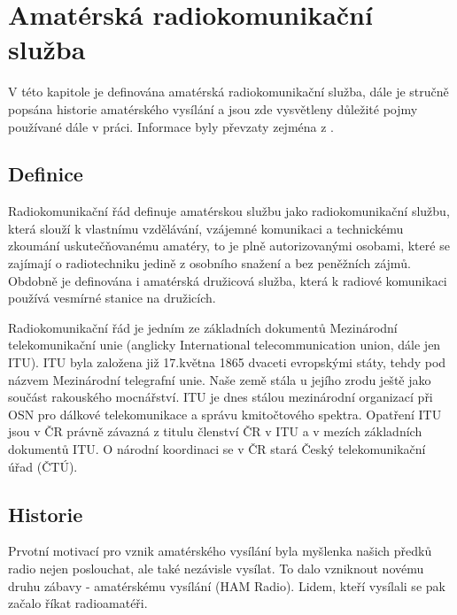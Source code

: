 \chapter{Amatérská radiokomunikační služba}
\label{radioamateri}

V této kapitole je definována amatérská radiokomunikační služba, dále je stručně popsána historie amatérského vysílání a jsou zde vysvětleny důležité pojmy používané dále v práci. Informace byly převzaty zejména z \cite{crk_hist}.

\section{Definice}
\label{radioamateri_def}

Radiokomunikační řád definuje amatérskou službu jako
radiokomunikační službu, která slouží k vlastnímu vzdělávání, vzájemné
komunikaci a technickému zkoumání uskutečňovanému amatéry, to je plně
autorizovanými osobami, které se zajímají o radiotechniku jedině z osobního
snažení a bez peněžních zájmů. Obdobně je definována i amatérská družicová
služba, která k radiové komunikaci používá vesmírné stanice na družicích.

Radiokomunikační řád je jedním ze základních dokumentů Mezinárodní
telekomunikační unie (anglicky International telecommunication union, dále jen
ITU). %
ITU byla založena již 17.května 1865 dvaceti evropskými státy, tehdy pod názvem Mezinárodní telegrafní
unie. Naše země stála u jejího zrodu ještě jako součást rakouského mocnářství. ITU
je dnes stálou mezinárodní organizací při OSN pro dálkové telekomunikace a
správu kmitočtového spektra.
Opatření ITU jsou v ČR právně závazná z titulu členství ČR v ITU a v
mezích základních dokumentů ITU. O národní koordinaci se v ČR stará
Český telekomunikační úřad (ČTÚ). %

\section{Historie}
\label{radioamateri_hist}
Prvotní motivací pro vznik amatérského vysílání %
byla myšlenka našich předků radio %
nejen poslouchat, ale také nezávisle vysílat.
To dalo vzniknout novému druhu zábavy - amatérskému vysílání (HAM Radio). Lidem, kteří vysílali se pak začalo říkat 
radioamatéři.

